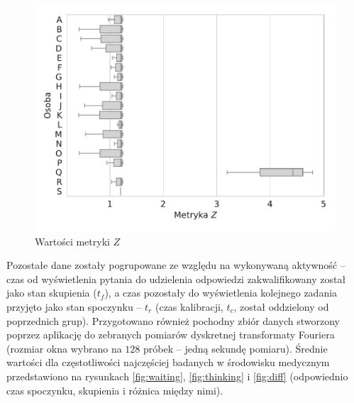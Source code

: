 \documentclass{./assets/wfis}
\begin{document}
\begin{figure}[h!]
    \centering
    \includegraphics[width=0.75\columnwidth]{plots/zscore.pdf}
    \caption{Wartości metryki $Z$}
    \label{fig:zscore}
\end{figure}

Pozostałe dane zostały pogrupowane ze względu na wykonywaną aktywność – czas od wyświetlenia pytania do udzielenia odpowiedzi zakwalifikowany został jako stan skupienia ($t_f$), a czas pozostały do wyświetlenia kolejnego zadania przyjęto jako stan spoczynku – $t_r$ (czas kalibracji, $t_c$, został oddzielony od poprzednich grup). 
Przygotowano również pochodny zbiór danych stworzony poprzez aplikację do zebranych pomiarów dyskretnej transformaty Fouriera (rozmiar okna wybrano na $128$ próbek – jedną sekundę pomiaru).  Średnie wartości dla częstotliwości najczęściej badanych w środowisku medycznym przedstawiono na rysunkach \ref{fig:waiting}, \ref{fig:thinking} i \ref{fig:diff} (odpowiednio czas spoczynku, skupienia i różnica między nimi).
\end{document}
